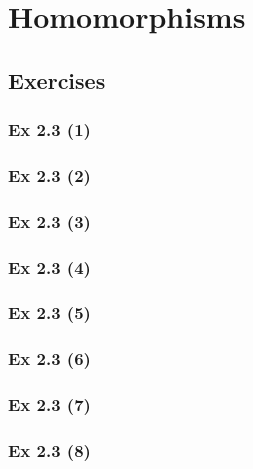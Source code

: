 \newpage		%

\section{Homomorphisms}\label{sec:2.3}
\subsection{Exercises}\label{sec:2.3 _Exercises}

\subsubsection{Ex 2.3 (1)}\label{sec:Ex_2.3.1}

\subsubsection{Ex 2.3 (2)}\label{sec:Ex_2.3.2}

\subsubsection{Ex 2.3 (3)}\label{sec:Ex_2.3.3}

\subsubsection{Ex 2.3 (4)}\label{sec:Ex_2.3.4}

\subsubsection{Ex 2.3 (5)}\label{sec:Ex_2.3.5}

\subsubsection{Ex 2.3 (6)}\label{sec:Ex_2.3.6}

\subsubsection{Ex 2.3 (7)}\label{sec:Ex_2.3.7}

\subsubsection{Ex 2.3 (8)}\label{sec:Ex_2.3.8}


